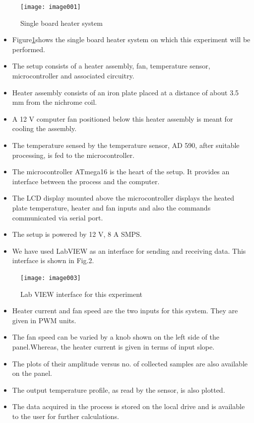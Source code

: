 \documentclass[12pt,prb]{article}
\begin{document}
\begin{figure}[h]
\centering
\texttt{[image: image001]}
\caption{Single board heater system}
\label{fig:sbhs}
\end{figure}
\begin{itemize}
\item 
Figure\ref{fig:sbhs}shows the single board heater system on which this experiment will be performed.
\item The setup consists of a heater assembly, fan, temperature sensor, microcontroller and associated circuitry.
\item Heater assembly consists of an iron plate placed at a distance of about 3.5 mm from the nichrome coil. 
\item A 12 V computer fan positioned below this heater assembly is meant for cooling the assembly.
\item The temperature sensed by the temperature sensor, AD 590, after suitable processing, is fed to the microcontroller.
\item The microcontroller ATmega16 is the heart of the setup. It provides an interface between the process and the computer.
\item The LCD display mounted above the microcontroller displays the heated plate temperature, heater and fan inputs and also the commands communicated via serial port. 
\item The setup is powered by 12 V, 8 A SMPS.
\item We have used LabVIEW as an interface for sending and receiving data. This interface is shown in Fig.2.\\
\end{itemize}
 \begin{figure}[h]
\centering
\texttt{[image: image003]}
\caption{Lab VIEW interface for this experiment}
\end{figure}
\pagebreak 
\begin{itemize}
\item Heater current and fan speed are the two inputs for this system. They are given in PWM units. 
\item The fan speed can be varied by a knob shown on the left side of the panel.Whereas, the heater current is given in terms of input slope. 
\item The plots of their amplitude versus no. of collected samples are also available on the panel. 
\item The output temperature profile, as read by the sensor, is also plotted.   
\item The data acquired in the process is stored on the local drive and is available to the user for further calculations.
\end{itemize}
\end{document}
